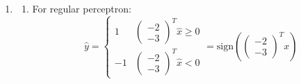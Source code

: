 \documentclass[11pt]{article}
\begin{document}
{\begin{enumerate}
\begin{align*}
                m &= m + 1 = 2, s_2 = 1\\
                w_2^{T}x_3 &= -1 < 0\\
                s_2 &= s_2 + 1 = 2\\
                w_2^{T}x_4 &= -4 < 0\\
                w_3 &\leftarrow w_2  + x_4 = \begin{pmatrix} 1 \\ -3 \end{pmatrix} \\
                m &= m + 1 = 3, s_3 = 1\\
                w_3^{T}x_5 &= -5 < 0\\
                s_3 &= s_3 + 1 = 2\\
                w_3^{T}x_6 &= 1 > 0\\
                s_3 &= s_3 + 1 = 3\\
                w_3^{T}x_7 &= -1 < 0\\
                s_3 &= s_3 + 1 = 4\\
                w_3^{T}x_8 &= 3 > 0\\
                w_4 &\leftarrow w_3 - x_8 = \begin{pmatrix} -2 \\ -3 \end{pmatrix} \\
                m &= m +1 = 4, s_4 = 1
            \end{align*}
        \item 
            \begin{enumerate}
                \item For regular perceptron:\\
                    \[
                    \hat y = 
                    \begin{cases}
                        1 & \begin{pmatrix} -2 \\ -3 \end{pmatrix}^{T} \hat x \ge 0\\
                        -1 & \begin{pmatrix} -2 \\ -3 \end{pmatrix}^{T} \hat x < 0
                    \end{cases}
                    = \text{sign}(\begin{pmatrix} -2 \\ -3 \end{pmatrix}^{T}x)
\]
\end{enumerate}
\end{enumerate}}
\end{document}
